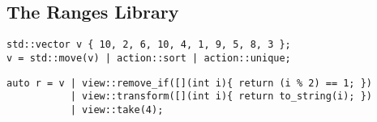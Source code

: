 \subsection{The Ranges Library} \label{sec:the_ranges_library}

    \begin{lstlisting}
std::vector v { 10, 2, 6, 10, 4, 1, 9, 5, 8, 3 };
v = std::move(v) | action::sort | action::unique; \end{lstlisting}

    \begin{lstlisting}
auto r = v | view::remove_if([](int i){ return (i % 2) == 1; })
           | view::transform([](int i){ return to_string(i); })
           | view::take(4); \end{lstlisting}
